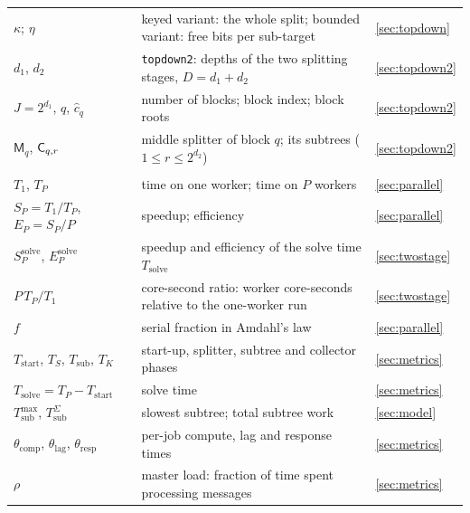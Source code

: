 \documentclass[11pt,a4paper]{article}
\newcommand{\dfam}[1]{\texttt{#1}}
\newcommand{\Tstart}{T_{\mathrm{start}}}
\newcommand{\Tsolve}{T_{\mathrm{solve}}}
\newcommand{\Tsub}{T_{\mathrm{sub}}}
\newcommand{\nM}{\mathsf{M}}\newcommand{\nA}{\mathsf{A}}\newcommand{\nB}{\mathsf{B}}
\begin{document}
\begin{longtable}{@{}p{}p{}p{}@{}}
$\kappa$; $\eta$ & keyed variant: the whole split; bounded variant: free bits per sub-target & \ref{sec:topdown} \\
$d_1$, $d_2$ & \dfam{topdown2}: depths of the two splitting stages, $D=d_1+d_2$ & \ref{sec:topdown2} \\
$J=2^{d_1}$, $q$, $\hat c_q$ & number of blocks; block index; block roots & \ref{sec:topdown2} \\
$\nM_q$, $\mathsf{C}_{q,r}$ & middle splitter of block $q$; its subtrees ($1\le r\le 2^{d_2}$) & \ref{sec:topdown2} \\
\addlinespace
\multicolumn{3}{@{}l}{\emph{Performance}}\\
$T_1$, $T_P$ & time on one worker; time on $P$ workers & \ref{sec:parallel} \\
$S_P=T_1/T_P$, $E_P=S_P/P$ & speedup; efficiency & \ref{sec:parallel} \\
$S_P^{\mathrm{solve}}$, $E_P^{\mathrm{solve}}$ & speedup and efficiency of the solve time $\Tsolve$ & \ref{sec:twostage} \\
$P\,T_P/T_1$ & core-second ratio: worker core-seconds relative to the one-worker run & \ref{sec:twostage} \\
$f$ & serial fraction in Amdahl's law & \ref{sec:parallel} \\
$\Tstart$, $T_S$, $\Tsub$, $T_K$ & start-up, splitter, subtree and collector phases & \ref{sec:metrics} \\
$\Tsolve=T_P-\Tstart$ & solve time & \ref{sec:metrics} \\
$\Tsub^{\max}$, $\Tsub^{\Sigma}$ & slowest subtree; total subtree work & \ref{sec:model} \\
$\theta_{\mathrm{comp}}$, $\theta_{\mathrm{lag}}$, $\theta_{\mathrm{resp}}$ & per-job compute, lag and response times & \ref{sec:metrics} \\
$\rho$ & master load: fraction of time spent processing messages & \ref{sec:metrics} \\
\bottomrule
\end{longtable}
\normalsize
\end{document}
